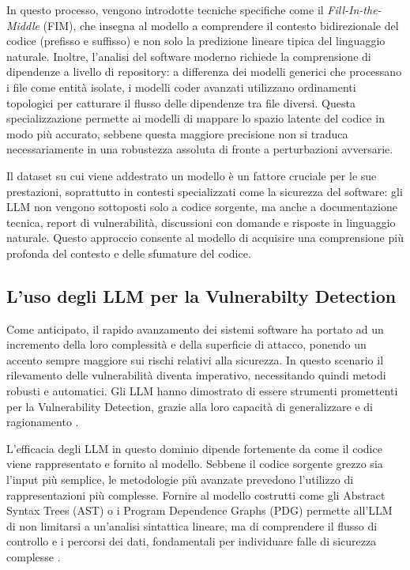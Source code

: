 In questo processo, vengono introdotte tecniche specifiche come il \textit{Fill-In-the-Middle} (FIM), che insegna al modello a comprendere il contesto bidirezionale del codice (prefisso e suffisso) e non solo la predizione lineare tipica del linguaggio naturale. Inoltre, l'analisi del software moderno richiede la comprensione di dipendenze a livello di repository: a differenza dei modelli generici che processano i file come entità isolate, i modelli coder avanzati utilizzano ordinamenti topologici per catturare il flusso delle dipendenze tra file diversi. Questa specializzazione permette ai modelli di mappare lo spazio latente del codice in modo più accurato, sebbene questa maggiore precisione non si traduca necessariamente in una robustezza assoluta di fronte a perturbazioni avversarie.

Il dataset su cui viene addestrato un modello è un fattore cruciale per le sue prestazioni, soprattutto in contesti specializzati come la sicurezza del software: gli LLM non vengono sottoposti solo a codice sorgente, ma anche a documentazione tecnica, report di vulnerabilità, discussioni con domande e risposte in linguaggio naturale.
Questo approccio consente al modello di acquisire una comprensione più profonda del contesto e delle sfumature del codice.

\subsection{L'uso degli LLM per la Vulnerabilty Detection}

Come anticipato, il rapido avanzamento dei sistemi software ha portato ad un incremento della loro complessità e della superficie di attacco, ponendo un accento sempre maggiore sui rischi relativi alla sicurezza. In questo scenario il rilevamento delle vulnerabilità diventa imperativo, necessitando quindi metodi robusti e automatici.
Gli LLM hanno dimostrato di essere strumenti promettenti per la Vulnerability Detection, grazie alla loro capacità di generalizzare e di ragionamento \cite{gao2023fargonevulnerabilitydetection}.

L'efficacia degli LLM in questo dominio dipende fortemente da come il codice viene rappresentato e fornito al modello. Sebbene il codice sorgente grezzo sia l'input più semplice, le metodologie più avanzate prevedono l'utilizzo di rappresentazioni più complesse. Fornire al modello costrutti come gli Abstract Syntax Trees (AST) o i Program Dependence Graphs (PDG) permette all'LLM di non limitarsi a un'analisi sintattica lineare, ma di comprendere il flusso di controllo e i percorsi dei dati, fondamentali per individuare falle di sicurezza complesse \cite{guo2021graphcodebertpretrainingcoderepresentations}.

